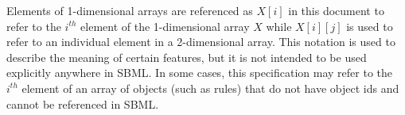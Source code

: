 Elements of 1-dimensional arrays are referenced as $X[i]$ in this document to refer to the  $i^{th}$ element of the 1-dimensional array $X$ while $X[i][j]$ is used to refer to an individual element in a 2-dimensional array.
This notation is used to describe the meaning of certain features, but it is not intended to be used explicitly anywhere in SBML. 
In some cases, this specification may refer to the $i^{th}$ element of an array of objects (such as rules) that do not have object ids and cannot be referenced in SBML. 



